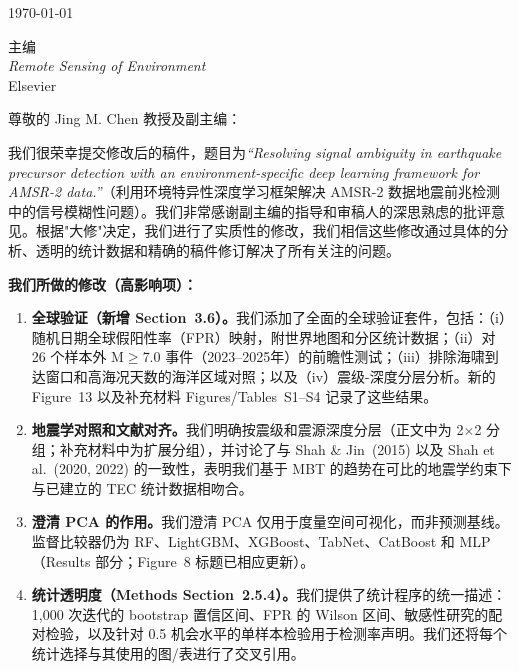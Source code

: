 \documentclass[12pt]{article}
\begin{document}
\pagestyle{empty}

\begin{flushright}
\today
\end{flushright}

\bigskip

主编\\
\textit{Remote Sensing of Environment}\\
Elsevier

\bigskip

尊敬的 Jing M. Chen 教授及副主编：

我们很荣幸提交修改后的稿件，题目为\textit{``Resolving signal ambiguity in earthquake precursor detection with an environment-specific deep learning framework for AMSR-2 data.''}（利用环境特异性深度学习框架解决 AMSR-2 数据地震前兆检测中的信号模糊性问题）。我们非常感谢副主编的指导和审稿人的深思熟虑的批评意见。根据"大修"决定，我们进行了实质性的修改，我们相信这些修改通过具体的分析、透明的统计数据和精确的稿件修订解决了所有关注的问题。

\medskip

\noindent\textbf{我们所做的修改（高影响项）：}

\begin{enumerate}
\item \textbf{全球验证（新增 Section~3.6）。}我们添加了全面的全球验证套件，包括：（i）随机日期全球假阳性率（FPR）映射，附世界地图和分区统计数据；（ii）对 26 个样本外 M$\ge$7.0 事件（2023--2025年）的前瞻性测试；（iii）排除海啸到达窗口和高海况天数的海洋区域对照；以及（iv）震级-深度分层分析。新的 Figure~13 以及补充材料 Figures/Tables~S1--S4 记录了这些结果。
\item \textbf{地震学对照和文献对齐。}我们明确按震级和震源深度分层（正文中为 2$\times$2 分组；补充材料中为扩展分组），并讨论了与 Shah \& Jin~(2015) 以及 Shah et al.~(2020, 2022) 的一致性，表明我们基于 MBT 的趋势在可比的地震学约束下与已建立的 TEC 统计数据相吻合。
\item \textbf{澄清 PCA 的作用。}我们澄清 PCA 仅用于度量空间可视化，而非预测基线。监督比较器仍为 RF、LightGBM、XGBoost、TabNet、CatBoost 和 MLP（Results 部分；Figure~8 标题已相应更新）。
\item \textbf{统计透明度（Methods Section~2.5.4）。}我们提供了统计程序的统一描述：1,000 次迭代的 bootstrap 置信区间、FPR 的 Wilson 区间、敏感性研究的配对检验，以及针对 0.5 机会水平的单样本检验用于检测率声明。我们还将每个统计选择与其使用的图/表进行了交叉引用。
\end{enumerate}

\medskip
\end{document}
